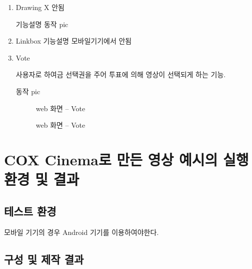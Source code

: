 \begin{enumerate}
    \item Drawing X 안됨

    기능설명
    동작 pic


    \item Linkbox
    기능설명 모바일기기에서 안됨

    \item Vote

    사용자로 하여금 선택권을 주어 투표에 의해 영상이 선택되게 하는 기능.

    동작 pic

    \begin{figure}[h!]
    \centering
    \caption{web 화면 – Vote}
    \end{figure} 


    \begin{figure}[h!]
    \centering
    \caption{web 화면 – Vote}
    \end{figure} 

\end{enumerate}

\section{ COX Cinema로 만든 영상 예시의 실행환경 및 결과 }

\subsection{테스트 환경 }
\spec
모바일 기기의 경우 Android 기기를 이용하여야한다.

\subsection{ 구성 및 제작 결과}

